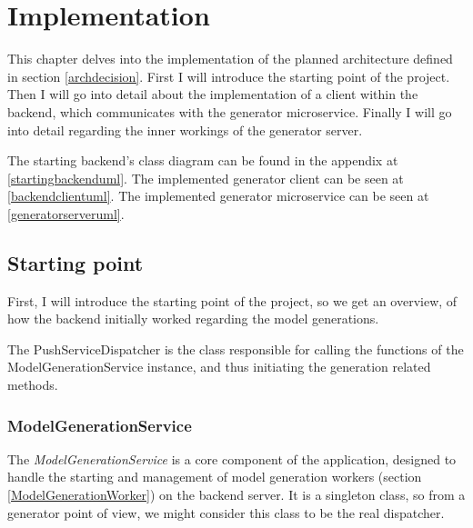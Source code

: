 \chapter{Implementation} \label{Implementation}

	This chapter delves into the implementation of the planned architecture defined in section \ref{archdecision}.
	First I will introduce the starting point of the project.
	Then I will go into detail about the implementation of a client within the backend, which communicates with 
	the generator microservice. Finally I will go into detail
	regarding the inner workings of the generator server.

	The starting backend's class diagram can be found in the appendix at \ref{startingbackenduml}.
	The implemented generator client can be seen at \ref{backendclientuml}.
	The implemented generator microservice can be seen at \ref{generatorserveruml}.

	\section{Starting point} \label{Starting point}
		First, I will introduce the starting point of the project, so we get an overview, of how the backend initially worked regarding the model
		generations.

		The PushServiceDispatcher is the class responsible for calling the functions of the ModelGenerationService instance, and thus initiating
		the generation related methods.

		\subsection{ModelGenerationService} \label{ModelGenerationService}
			The \textit{ModelGenerationService} is a core component of the application, designed to handle the starting and management of
			model generation workers (section \ref{ModelGenerationWorker}) on the backend server. 
			It is a singleton class, so from a generator point of view, we might consider this class to be the real dispatcher.

